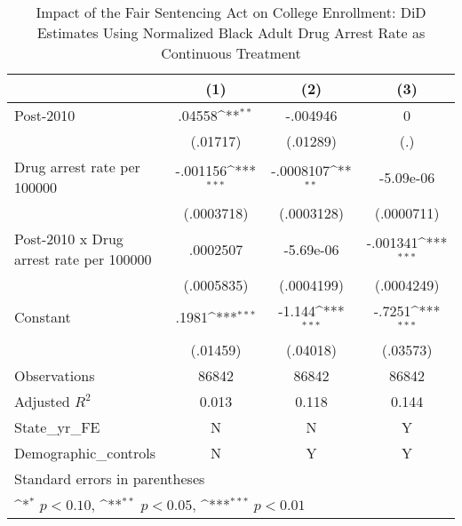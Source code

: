 \begin{table}[htbp]\centering
\def\sym#1{\ifmmode^{#1}\else\(^{#1}\)\fi}
\caption{Impact of the Fair Sentencing Act on College Enrollment: DiD Estimates Using Normalized Black Adult Drug Arrest Rate as Continuous Treatment}
\begin{tabular}{l*{3}{c}}
\hline\hline
                    &\multicolumn{1}{c}{(1)}         &\multicolumn{1}{c}{(2)}         &\multicolumn{1}{c}{(3)}         \\
\hline
Post-2010           &      .04558\sym{**} &    -.004946         &           0         \\
                    &    (.01717)         &    (.01289)         &         (.)         \\
[1em]
Drug arrest rate per 100000&    -.001156\sym{***}&   -.0008107\sym{**} &   -5.09e-06         \\
                    &  (.0003718)         &  (.0003128)         &  (.0000711)         \\
[1em]
Post-2010 x Drug arrest rate per 100000&    .0002507         &   -5.69e-06         &    -.001341\sym{***}\\
                    &  (.0005835)         &  (.0004199)         &  (.0004249)         \\
[1em]
Constant            &       .1981\sym{***}&      -1.144\sym{***}&      -.7251\sym{***}\\
                    &    (.01459)         &    (.04018)         &    (.03573)         \\
\hline
Observations        &       86842         &       86842         &       86842         \\
Adjusted \(R^{2}\)  &       0.013         &       0.118         &       0.144         \\
State\_yr\_FE         &           N         &           N         &           Y         \\
Demographic\_controls&           N         &           Y         &           Y         \\
\hline\hline
\multicolumn{4}{l}{\footnotesize Standard errors in parentheses}\\
\multicolumn{4}{l}{\footnotesize \sym{*} \(p<0.10\), \sym{**} \(p<0.05\), \sym{***} \(p<0.01\)}\\
\end{tabular}
\end{table}
